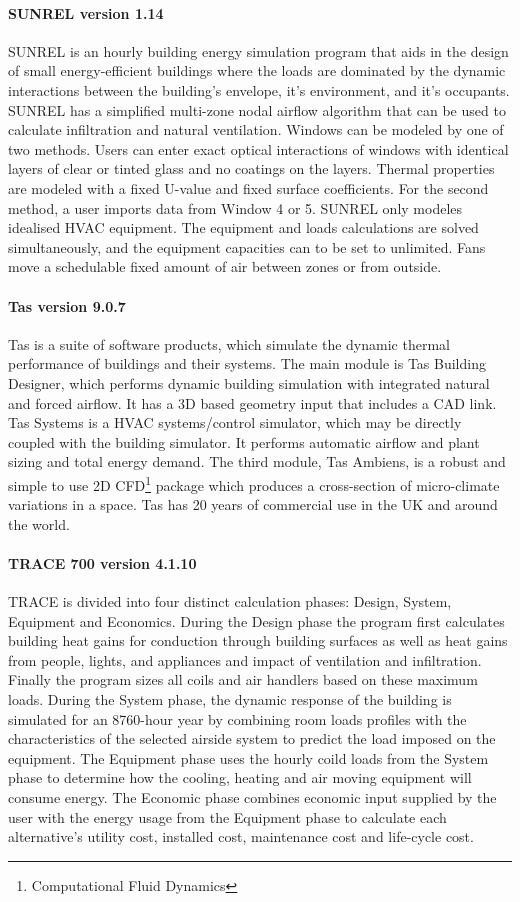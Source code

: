 \paragraph{SUNREL version 1.14} SUNREL is an hourly building energy simulation program that aids in the design of small energy-efficient buildings where the loads are dominated by the dynamic interactions between the building's envelope, it's environment, and it's occupants. SUNREL has a simplified multi-zone nodal airflow algorithm that can be used to calculate infiltration and natural ventilation. Windows can be modeled by one of two methods. Users can enter exact optical interactions of windows with identical layers of clear or tinted glass and no coatings on the layers. Thermal properties are modeled with a fixed U-value and fixed surface coefficients. For the second method, a user imports data from Window 4 or 5. SUNREL only modeles idealised HVAC equipment. The equipment and loads calculations are solved simultaneously, and the equipment capacities can to be set to unlimited. Fans move a schedulable fixed amount of air between zones or from outside.

\paragraph{Tas version 9.0.7} Tas is a suite of software products, which simulate the dynamic thermal performance of buildings and their systems. The main module is Tas Building Designer, which performs dynamic building simulation with integrated natural and forced airflow. It has a 3D based geometry input that includes a CAD link. Tas Systems is a HVAC systems/control simulator, which may be directly coupled with the building simulator. It performs automatic airflow and plant sizing and total energy demand. The third module, Tas Ambiens, is a robust and simple to use 2D CFD\footnote{Computational Fluid Dynamics} package which produces a cross-section of micro-climate variations in a space. Tas has 20 years of commercial use in the UK and around the world.

\paragraph{TRACE 700 version 4.1.10} TRACE is divided into four distinct calculation phases: Design, System, Equipment and Economics. During the Design phase the program first calculates building heat gains for conduction through building surfaces as well as heat gains from people, lights, and appliances and impact of ventilation and infiltration. Finally the program sizes all coils and air handlers based on these maximum loads. During the System phase, the dynamic response of the building is simulated for an 8760-hour year by combining room loads profiles with the characteristics of the selected airside system to predict the load imposed on the equipment. The Equipment phase uses the hourly coild loads from the System phase to determine how the cooling, heating and air moving equipment will consume energy. The Economic phase combines economic input supplied by the user with the energy usage from the Equipment phase to calculate each alternative's utility cost, installed cost, maintenance cost and life-cycle cost.

